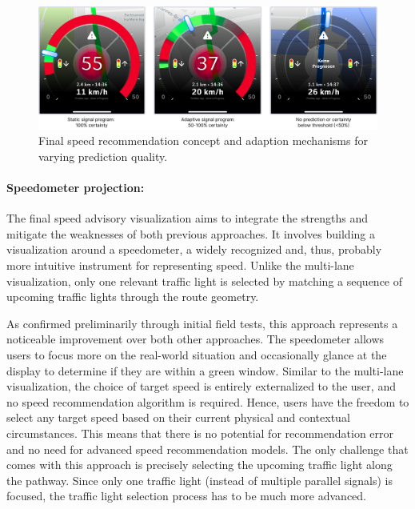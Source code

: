 \begin{figure}[htbp]
\centering
\includegraphics[width=\linewidth]{images/speedometer-adaptions.png}
\caption{Final speed recommendation concept and adaption mechanisms for varying prediction quality.}
\label{fig:speedometer-adaptions}
\end{figure}

\paragraph{Speedometer projection:} The final speed advisory visualization aims to integrate the strengths and mitigate the weaknesses of both previous approaches. It involves building a visualization around a speedometer, a widely recognized and, thus, probably more intuitive instrument for representing speed. Unlike the multi-lane visualization, only one relevant traffic light is selected by matching a sequence of upcoming traffic lights through the route geometry.

As confirmed preliminarily through initial field tests, this approach represents a noticeable improvement over both other approaches. The speedometer allows users to focus more on the real-world situation and occasionally glance at the display to determine if they are within a green window. Similar to the multi-lane visualization, the choice of target speed is entirely externalized to the user, and no speed recommendation algorithm is required. Hence, users have the freedom to select any target speed based on their current physical and contextual circumstances. This means that there is no potential for recommendation error and no need for advanced speed recommendation models. The only challenge that comes with this approach is precisely selecting the upcoming traffic light along the pathway. Since only one traffic light (instead of multiple parallel signals) is focused, the traffic light selection process has to be much more advanced.


